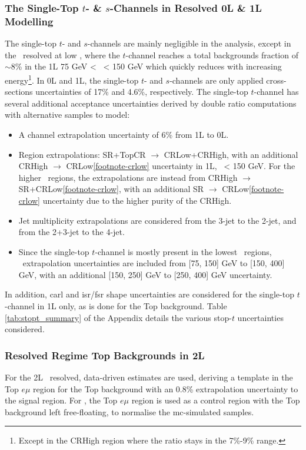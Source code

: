 \subsubsection{The Single-Top $t$- \& $s$-Channels in Resolved 0L \& 1L Modelling}
The single-top $t$- and $s$-channels are mainly negligible in the analysis, except in the \vhb\ resolved at low \ptv, where the $t$-channel reaches a total backgrounds fraction of $\sim$8\% in the 1L 75 GeV < \ptv\ < 150 GeV which quickly reduces with increasing energy\footnote{Except in the CRHigh region where the ratio stays in the 7\%-9\% range.}. In 0L and 1L, the single-top $t$- and $s$-channels are only applied cross-sections uncertainties of 17\% and 4.6\%, respectively. The single-top $t$-channel has several additional acceptance uncertainties derived by double ratio computations with alternative samples to model: 
\begin{itemize}
    \item A channel extrapolation uncertainty of 6\% from 1L to 0L.
    \item Region extrapolations: SR+TopCR $\rightarrow$ CRLow+CRHigh, with an additional CRHigh $\rightarrow$ CRLow\cref{footnote-crlow} uncertainty in 1L, \ptv\ < 150 GeV. For the higher \ptv\ regions, the extrapolations are instead from CRHigh $\rightarrow$ SR+CRLow\cref{footnote-crlow}, with an additional SR $\rightarrow$ CRLow\cref{footnote-crlow} uncertainty due to the higher purity of the CRHigh.
    \item Jet multiplicity extrapolations are considered from the 3-jet to the 2-jet, and from the 2+3-jet to the 4-jet.
    \item Since the single-top $t$-channel is mostly present in the lowest \ptv\ regions, \ptv\ extrapolation uncertainties are included from [75, 150] GeV to [150, 400] GeV, with an additional [150, 250] GeV to [250, 400] GeV uncertainty.
\end{itemize}
In addition, \gls{carl} and \gls{isr}/\gls{fsr} shape uncertainties are considered for the single-top $t$-channel in 1L only, as is done for the Top background. Table \ref{tab:stopt_summary} of the Appendix details the various stop-$t$ uncertainties considered.

\subsubsection{Resolved Regime Top Backgrounds in 2L} 
For the 2L \vhb\ resolved, data-driven estimates are used, deriving a template in the Top $e\mu$ region for the Top background with an 0.8\% extrapolation uncertainty to the signal region. For \vhc, the Top $e\mu$ region is used as a control region with the Top background left free-floating, to normalise the \gls{mc}-simulated samples.

